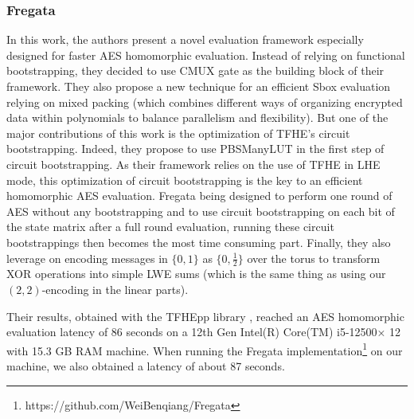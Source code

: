 \subsubsection{Fregata \cite{ISC:WWLLL23}}
In this work, the authors present a novel evaluation framework especially designed for faster AES homomorphic evaluation. Instead of relying on functional bootstrapping, they decided to use CMUX gate as the building block of their framework. They also propose a new technique for an efficient Sbox evaluation relying on mixed packing (which combines different ways of organizing encrypted data within polynomials to balance parallelism and flexibility). %
But one of the major contributions of this work is the optimization of TFHE's circuit bootstrapping. Indeed, they propose to use PBSManyLUT \cite{AC:CLOT21} in the first step of circuit bootstrapping. As their framework relies on the use of TFHE in LHE mode, this optimization of circuit bootstrapping is the key to an efficient homomorphic AES evaluation. Fregata being designed to perform one round of AES without any bootstrapping and to use circuit bootstrapping on each bit of the state matrix after a full round evaluation, running these circuit bootstrappings then becomes the most time consuming part.
Finally, they also leverage on encoding messages in $\{0, 1\}$ as $\{0, \frac{1}{2}\}$ over the torus to transform XOR operations into simple LWE sums (which is the same thing as using our $(2, 2)$-encoding in the linear parts).

Their results, obtained with the TFHEpp library \cite{TFHEpp}, reached an AES homomorphic evaluation latency of 86 seconds on a 12th Gen Intel(R) Core(TM) i5-12500× 12 with 15.3 GB RAM machine. When running the Fregata implementation\footnote{https://github.com/WeiBenqiang/Fregata} on our machine, we also obtained a latency of about 87 seconds.


